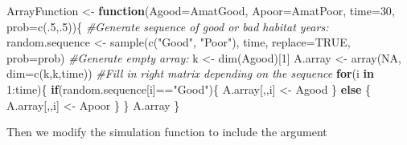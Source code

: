 \documentclass[
]{book}
\newenvironment{Shaded}{\begin{snugshade}}{\end{snugshade}}
\newcommand{\AttributeTok}[1]{\textcolor[rgb]{0.77,0.63,0.00}{#1}}
\newcommand{\CommentTok}[1]{\textcolor[rgb]{0.56,0.35,0.01}{\textit{#1}}}
\newcommand{\ConstantTok}[1]{\textcolor[rgb]{0.00,0.00,0.00}{#1}}
\newcommand{\ControlFlowTok}[1]{\textcolor[rgb]{0.13,0.29,0.53}{\textbf{#1}}}
\newcommand{\DecValTok}[1]{\textcolor[rgb]{0.00,0.00,0.81}{#1}}
\newcommand{\FunctionTok}[1]{\textcolor[rgb]{0.00,0.00,0.00}{#1}}
\newcommand{\NormalTok}[1]{#1}
\newcommand{\OtherTok}[1]{\textcolor[rgb]{0.56,0.35,0.01}{#1}}
\newcommand{\SpecialCharTok}[1]{\textcolor[rgb]{0.00,0.00,0.00}{#1}}
\newcommand{\StringTok}[1]{\textcolor[rgb]{0.31,0.60,0.02}{#1}}
\begin{document}
\begin{Shaded}
\begin{Highlighting}[]
\NormalTok{ArrayFunction }\OtherTok{\textless{}{-}} \ControlFlowTok{function}\NormalTok{(}\AttributeTok{Agood=}\NormalTok{AmatGood, }
                          \AttributeTok{Apoor=}\NormalTok{AmatPoor,}
                          \AttributeTok{time=}\DecValTok{30}\NormalTok{, }
                          \AttributeTok{prob=}\FunctionTok{c}\NormalTok{(.}\DecValTok{5}\NormalTok{,.}\DecValTok{5}\NormalTok{))\{}
  \CommentTok{\#Generate sequence of good or bad habitat years:}
\NormalTok{  random.sequence }\OtherTok{\textless{}{-}} \FunctionTok{sample}\NormalTok{(}\FunctionTok{c}\NormalTok{(}\StringTok{"Good"}\NormalTok{, }\StringTok{"Poor"}\NormalTok{), }
\NormalTok{                            time,}
                            \AttributeTok{replace=}\ConstantTok{TRUE}\NormalTok{,}
                            \AttributeTok{prob=}\NormalTok{prob)}
  \CommentTok{\#Generate empty array:}
\NormalTok{  k }\OtherTok{\textless{}{-}} \FunctionTok{dim}\NormalTok{(Agood)[}\DecValTok{1}\NormalTok{]}
\NormalTok{  A.array }\OtherTok{\textless{}{-}} \FunctionTok{array}\NormalTok{(}\ConstantTok{NA}\NormalTok{, }\AttributeTok{dim=}\FunctionTok{c}\NormalTok{(k,k,time))}
  \CommentTok{\#Fill in right matrix depending on the sequence}
  \ControlFlowTok{for}\NormalTok{(i }\ControlFlowTok{in} \DecValTok{1}\SpecialCharTok{:}\NormalTok{time)\{}
    \ControlFlowTok{if}\NormalTok{(random.sequence[i]}\SpecialCharTok{==}\StringTok{"Good"}\NormalTok{)\{}
\NormalTok{      A.array[,,i] }\OtherTok{\textless{}{-}}\NormalTok{ Agood}
\NormalTok{    \}}
    \ControlFlowTok{else}\NormalTok{ \{}
\NormalTok{       A.array[,,i] }\OtherTok{\textless{}{-}}\NormalTok{ Apoor}
\NormalTok{    \}}
\NormalTok{  \}}
\NormalTok{  A.array}
\NormalTok{\}}
\end{Highlighting}
\end{Shaded}

Then we modify the simulation function to include the argument
\end{document}
